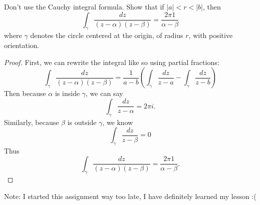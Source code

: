 \documentclass[12pt]{article}
\newenvironment{statement}[2][Statement]{\begin{trivlist}
\item[\hskip \labelsep {\bfseries #1}\hskip \labelsep {\bfseries #2.}]}{\end{trivlist}}
\begin{document}
\begin{statement}[Problem]{(Tie) 4} 
  Don't use the Cauchy integral formula. Show that if $\lvert a \rvert < r < \lvert b \rvert$, then 
  \begin{equation*}
    \int_{\gamma} \frac{dz}{(z-\alpha)(z-\beta)} = \frac{2\pi 1}{\alpha - \beta}
  \end{equation*}
  where $\gamma$ denotes the circle centered at the origin, of radius $r$, with positive orientation. 
\end{statement}
\begin{proof}
  First, we can rewrite the integral like so using partial fractions:
  \begin{equation*}
    \int_{\gamma} \frac{dz}{(z-\alpha)(z-\beta)} = \frac{1}{a-b} \left (\int_{\gamma} \frac{dz}{z-a} - \int_{\gamma} \frac{dz}{z-b} \right )
  \end{equation*}
  Then because $\alpha$ is inside $\gamma$, we can say 
  \begin{equation*}
    \int_{\gamma} \frac{dz}{z-\alpha} = 2\pi i.
  \end{equation*}
  Similarly, because $\beta$ is outside $\gamma$, we know 
  \begin{equation*}
    \int_{\gamma} \frac{dz}{z-\beta} = 0
  \end{equation*}
  Thus 
  \begin{equation*}
    \int_{\gamma} \frac{dz}{(z-\alpha)(z-\beta)} = \frac{2\pi 1}{\alpha - \beta}.
  \end{equation*} 
\end{proof}

\par Note: I started this assignment way too late, I have definitely learned my lesson :(
\end{document}

